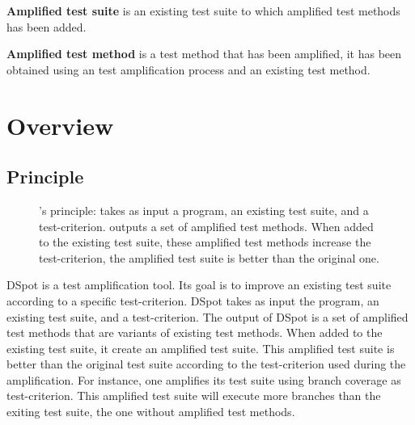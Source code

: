 \textbf{Amplified test suite} is an existing test suite to which amplified test methods has been added.

\textbf{Amplified test method} is a test method that has been amplified, \ie it has been obtained using an test amplification process and an existing test method.

\section{Overview}
\label{sec:dspot:overview}

\subsection{Principle}
\label{subsec:dspot:overview:principle}

\begin{figure}[h]
	\centering
	\caption{
		\dspot's principle: \dspot takes as input a program, an existing test suite, and a test-criterion. 
		\dspot outputs a set of amplified test methods.
		When added to the existing test suite, these amplified test methods increase the test-criterion, \ie the amplified test suite is better than the original one.
	}
	\label{fig:dspot:principle}
\end{figure}

DSpot is a test amplification tool.
Its goal is to improve an existing test suite according to a specific test-criterion.
DSpot takes as input the program, an existing test suite, and a test-criterion. 
The output of DSpot is a set of amplified test methods that are variants of existing test methods.
When added to the existing test suite, it create an amplified test suite.
This amplified test suite is better than the original test suite according to the test-criterion used during the amplification.
For instance, one amplifies its test suite using branch coverage as test-criterion.
This amplified test suite will execute more branches than the exiting test suite, \ie the one without amplified test methods.

